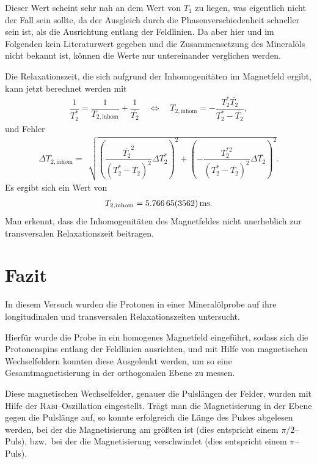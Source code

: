 \documentclass[10pt]{article}
\begin{document}
\begin{multicols}{2}
Dieser Wert scheint sehr nah an dem Wert von $T_1$ zu liegen, was eigentlich nicht der Fall sein sollte, da der Ausgleich durch die Phasenverschiedenheit schneller sein ist, als die Ausrichtung entlang der Feldlinien.
Da aber hier und im Folgenden kein Literaturwert gegeben und die Zusammensetzung des Mineralöls nicht bekannt ist, können die Werte nur untereinander verglichen werden.

Die Relaxationszeit, die sich aufgrund der Inhomogenitäten im Magnetfeld ergibt, kann jetzt berechnet werden mit
\begin{align} 
        \dfrac{1}{T_2^*}=\dfrac{1}{T_{2,\text{inhom}}}+\dfrac{1}{\overline{T_2}}\quad \Leftrightarrow \quad T_{2,\text{inhom}}=-\dfrac{T_2^*\overline{T_2}}{T_2^*-\overline{T_2}}
,\end{align} 
und Fehler 
\begin{align} 
        \Delta T_{2,\text{inhom}}=\,\sqrt[]{\left(\dfrac{\overline{T_2}^2}{\left(T_2^*-\overline{T_2}\right)^2}\Delta T_2^*\right)^2+\left(-\dfrac{T_2^{*2}}{\left(T_2^*-\overline{T_2}\right)^2}\Delta \overline{T_2}\right)^2}
.\end{align} 
Es ergibt sich ein Wert von
\begin{align} 
        T_{2,\text{inhom}}=\SI{5.76665+-.03562}{ms}
.\end{align} 
Man erkennt, dass die Inhomogenitäten des Magnetfeldes nicht unerheblich zur transversalen Relaxationszeit beitragen.

\section{Fazit}
In diesem Versuch wurden die Protonen in einer Mineralölprobe auf ihre longitudinalen und transversalen Relaxationszeiten untersucht.

Hierfür wurde die Probe in ein homogenes Magnetfeld eingeführt, sodass sich die Protonenspins entlang der Feldlinien ausrichten, und mit Hilfe von magnetischen Wechselfeldern konnten diese Ausgelenkt werden, um so eine Gesamtmagnetisierung in der orthogonalen Ebene zu messen.

Diese magnetischen Wechselfelder, genauer die Pulslängen der Felder, wurden mit Hilfe der \textsc{Rabi}--Oszillation eingestellt.
Trägt man die Magnetisierung in der Ebene gegen die Pulslänge auf, so konnte erfolgreich die Länge des Pulses abgelesen werden, bei der die Magnetisierung am größten ist (dies entspricht einem $\pi /2$--Puls), bzw.\ bei der die Magnetisierung verschwindet (dies entspricht einem $\pi $--Puls).


\end{multicols}
\end{document}
